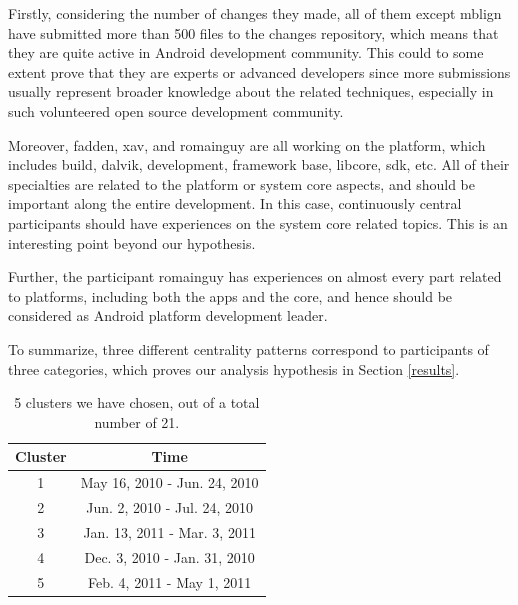 \documentclass[10pt, conference, compsocconf]{IEEEtran}
\begin{document}
Firstly, considering the number of changes they made, all of them except mblign have submitted more than 500 files to the changes repository, which means that they are quite active in Android development community. This could to some extent prove that they are experts or advanced developers since more submissions usually represent broader knowledge about the related techniques, especially in such volunteered open source development community.

Moreover, fadden, xav, and romainguy are all working on the platform, which includes build, dalvik, development, framework base, libcore, sdk, etc. All of their specialties are related to the platform or system core aspects, and should be important along the entire development. In this case, continuously central participants should have experiences on the system core related topics. This is an interesting point beyond our hypothesis.

Further, the participant romainguy has experiences on almost every part related to platforms, including both the apps and the core, and hence should be considered as Android platform development leader.

To summarize, three different centrality patterns correspond to participants of three categories, which proves our analysis hypothesis in Section \ref{results}.

\begin{table}[!t]
\centering
\caption{5 clusters we have chosen, out of a total number of 21.}
\begin{tabular}{|c|c|}
\hline
Cluster & Time  \\
\hline
1 & May 16, 2010 - Jun. 24, 2010 \\
\hline
2 & Jun. 2, 2010 - Jul. 24, 2010  \\
\hline
3 & Jan. 13, 2011 - Mar. 3, 2011 \\
\hline
4 & Dec. 3, 2010 - Jan. 31, 2010 \\
\hline
5 & Feb. 4, 2011 - May 1, 2011 \\
\hline
\end{tabular}
\label{cluster_list}
\end{table}
\end{document}
